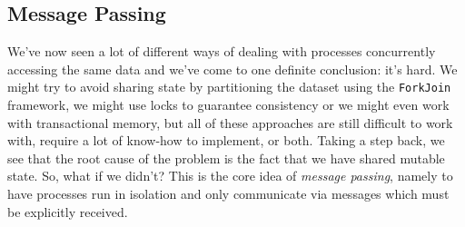 \documentclass[main]{subfiles}
\begin{document}
\newpage

\subsection{Message Passing}
We've now seen a lot of different ways of dealing with processes concurrently accessing the same data and we've come to one definite conclusion: it's hard. We might try to avoid sharing state by partitioning the dataset using the \texttt{ForkJoin} framework, we might use locks to guarantee consistency or we might even work with transactional memory, but all of these approaches are still difficult to work with, require a lot of know-how to implement, or both. Taking a step back, we see that the root cause of the problem is the fact that we have shared mutable state. So, what if we didn't? This is the core idea of \textit{message passing}, namely to have processes run in isolation and only communicate via messages which must be explicitly received.
\end{document}
